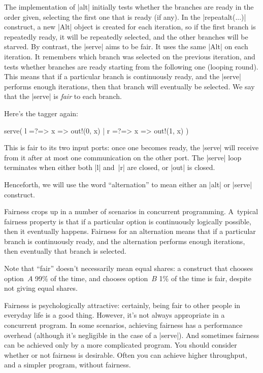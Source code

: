 
The implementation of |alt| initially tests whether the branches are ready in
the order given, selecting the first one that is ready (if any).  In the
|repeat{alt(...)}| construct, a new |Alt| object is created for each
iteration, so if the first branch is repeatedly ready, it will be repeatedly
selected, and the other branches will be starved.
%
By contrast, the |serve| aims to be fair.  It uses the same |Alt| on each
iteration.  It remembers which branch was selected on the previous iteration,
and tests whether branches are ready starting from the following one (looping
round).
%
This means that if a particular branch is continuously ready, and the |serve|
performs enough iterations, then that branch will eventually be selected.  We
say that the |serve| is \emph{fair} to each branch.



Here's the tagger again:
%
\begin{scala}
  serve( l =?=> { x => out!(0, x) } | r =?=> { x => out!(1, x) } )
\end{scala}
%
This is fair to its two input ports: once one becomes ready, the
|serve| will receive from it after at most one communication on the other
port.
%
The |serve| loop terminates when either both |l| and~|r| are closed, or |out|
is closed. 

Henceforth, we will use the word ``alternation'' to mean either an |alt| or
|serve| construct. 



Fairness crops up in a number of scenarios in concurrent programming.
%
A~typical fairness property is that if a particular option is continuously
logically possible, then it eventually happens.  Fairness for an alternation
means that if a particular branch is continuously ready, and the alternation
performs enough iterations, then eventually that branch is selected.

Note that ``fair'' doesn't necessarily mean equal shares: a construct that
chooses option~$A$ 99\% of the time, and chooses option~$B$ 1\% of the time is
fair, despite not giving equal shares.

Fairness is psychologically attractive: certainly, being fair to other people
in everyday life is a good thing.  However, it's not always appropriate in a
concurrent program.  In some scenarios, achieving fairness has a performance
overhead (although it's negligible in the case of a |serve|).  And sometimes
fairness can be achieved only by a more complicated program.  You should
consider whether or not fairness is desirable.  Often you can achieve higher
throughput, and a simpler program, without fairness.

